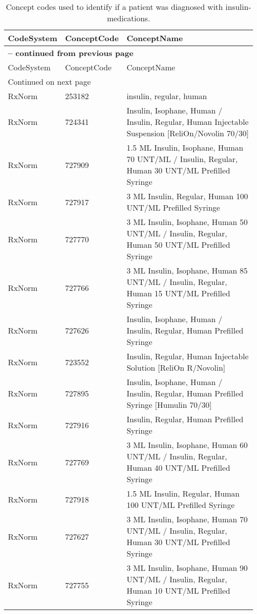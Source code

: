 \begin{longtable}{p{}p{}p{}}
\caption{Concept codes used to identify if a patient was diagnosed with insulin-medications.} \\ 
 CodeSystem & ConceptCode & ConceptName \\ 
  \hline 
\endfirsthead 
\multicolumn{3}{p{\textwidth}}{{ \bfseries \tablename \thetable{} -- continued from previous page}} \\ 
\hline CodeSystem & ConceptCode & ConceptName \\ \hline 
\endhead 
\hline \multicolumn{3}{p{\textwidth}}{{Continued on next page}} \\ \hline 
\endfoot 
\hline 
\endlastfoot 
 \hline
RxNorm & 253182 & insulin, regular, human \\ 
  RxNorm & 724341 & Insulin, Isophane, Human / Insulin, Regular, Human Injectable Suspension [ReliOn/Novolin 70/30] \\ 
  RxNorm & 727909 & 1.5 ML Insulin, Isophane, Human 70 UNT/ML / Insulin, Regular, Human 30 UNT/ML Prefilled Syringe \\ 
  RxNorm & 727917 & 3 ML Insulin, Regular, Human 100 UNT/ML Prefilled Syringe \\ 
  RxNorm & 727770 & 3 ML Insulin, Isophane, Human 50 UNT/ML / Insulin, Regular, Human 50 UNT/ML Prefilled Syringe \\ 
  RxNorm & 727766 & 3 ML Insulin, Isophane, Human 85 UNT/ML / Insulin, Regular, Human 15 UNT/ML Prefilled Syringe \\ 
  RxNorm & 727626 & Insulin, Isophane, Human / Insulin, Regular, Human Prefilled Syringe \\ 
  RxNorm & 723552 & Insulin, Regular, Human Injectable Solution [ReliOn R/Novolin] \\ 
  RxNorm & 727895 & Insulin, Isophane, Human / Insulin, Regular, Human Prefilled Syringe [Humulin 70/30] \\ 
  RxNorm & 727916 & Insulin, Regular, Human Prefilled Syringe \\ 
  RxNorm & 727769 & 3 ML Insulin, Isophane, Human 60 UNT/ML / Insulin, Regular, Human 40 UNT/ML Prefilled Syringe \\ 
  RxNorm & 727918 & 1.5 ML Insulin, Regular, Human 100 UNT/ML Prefilled Syringe \\ 
  RxNorm & 727627 & 3 ML Insulin, Isophane, Human 70 UNT/ML / Insulin, Regular, Human 30 UNT/ML Prefilled Syringe \\ 
  RxNorm & 727755 & 3 ML Insulin, Isophane, Human 90 UNT/ML / Insulin, Regular, Human 10 UNT/ML Prefilled Syringe \\ 

\end{longtable}
